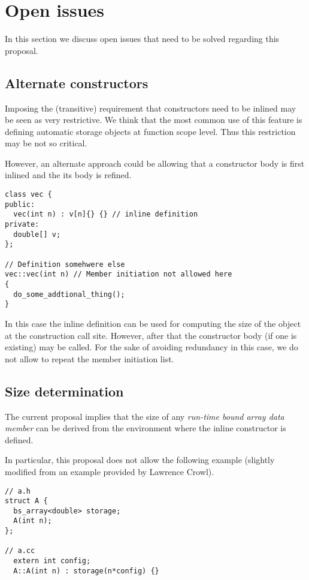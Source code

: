 \section{Open issues}

In this section we discuss open issues that need to be solved regarding this proposal.

\subsection{Alternate constructors}

Imposing the (transitive) requirement that constructors need to be inlined may
be seen as very restrictive. We think that the most common use of this feature
is defining automatic storage objects at function scope level. Thus this
restriction may be not so critical.

However, an alternate approach could be allowing that a constructor body is
first inlined and the its body is refined.

\begin{lstlisting}
class vec {
public:
  vec(int n) : v[n]{} {} // inline definition
private:
  double[] v;
};

// Definition somehwere else
vec::vec(int n) // Member initiation not allowed here
{
  do_some_addtional_thing();
}
\end{lstlisting}

In this case the inline definition can be used for computing the size of the
object at the construction call site. However, after that the constructor body
(if one is existing) may be called. For the sake of avoiding redundancy in this
case, we do not allow to repeat the member initiation list.

\subsection{Size determination}

The current proposal implies that the size of any \emph{run-time bound array
data member} can be derived from the environment where the inline constructor is
defined.

In particular, this proposal does not allow the following example (slightly
modified from an example provided by Lawrence Crowl).

\begin{lstlisting}
// a.h
struct A {
  bs_array<double> storage;
  A(int n);
};

// a.cc
  extern int config;
  A::A(int n) : storage(n*config) {}
\end{lstlisting}

